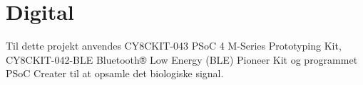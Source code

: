 \section{Digital }
Til dette projekt anvendes CY8CKIT-043 PSoC 4 M-Series Prototyping Kit, CY8CKIT-042-BLE Bluetooth® Low Energy (BLE) Pioneer Kit og programmet PSoC Creater til at opsamle det biologiske signal.